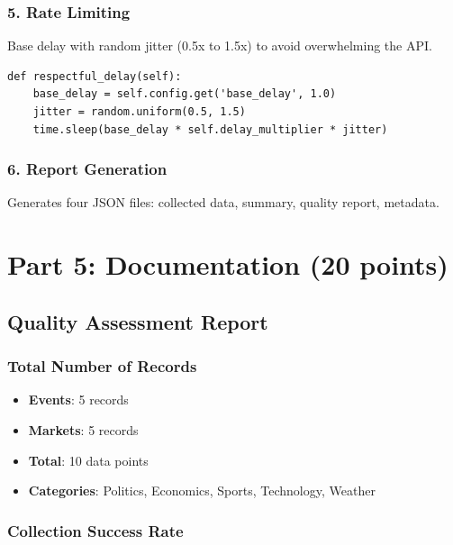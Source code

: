\documentclass[12pt,a4paper]{article}
\begin{document}
\subsubsection{5. Rate Limiting}

Base delay with random jitter (0.5x to 1.5x) to avoid overwhelming the API.

\begin{verbatim}
def respectful_delay(self):
    base_delay = self.config.get('base_delay', 1.0)
    jitter = random.uniform(0.5, 1.5)
    time.sleep(base_delay * self.delay_multiplier * jitter)
\end{verbatim}

\subsubsection{6. Report Generation}

Generates four JSON files: collected data, summary, quality report, metadata.

\section{Part 5: Documentation (20 points)}

\subsection{Quality Assessment Report}

\subsubsection{Total Number of Records}

\begin{itemize}
  \item \textbf{Events}: 5 records
  \item \textbf{Markets}: 5 records
  \item \textbf{Total}: 10 data points
  \item \textbf{Categories}: Politics, Economics, Sports, Technology, Weather
\end{itemize}

\subsubsection{Collection Success Rate}
\end{document}

